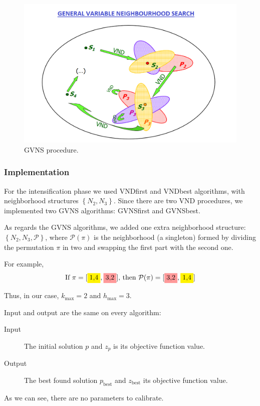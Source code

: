 \begin{figure}
	\centering
	\includegraphics[width=.65\textwidth]{GVNS.png}
	\caption{GVNS procedure.}
	\label{fig:GVNS}
\end{figure}



\subsubsection{Implementation}


For the intensification phase we used VNDfirst and VNDbest algorithms, with neighborhood structures $\left\{ N_2,  N_3\right\}$. Since there are two VND procedures, we implemented two GVNS algorithms: GVNSfirst and GVNSbest.




As regards the GVNS algorithms, we added one extra neighborhood structure: $\left\{ N_2,  N_3, \mathcal P \right\} $, where $ \mathcal P(\pi)$ is the neighborhood (a singleton) formed by dividing the permutation $\pi$ in two and swapping the first part with the second one. 

For example, 
\[
\text{If $\pi = [\colorbox{yellow}{$1$,$4$},\colorbox{red!40}{$3$,$2$}]$, then $ \mathcal P(\pi) =[\colorbox{red!40}{$3$,$2$},\colorbox{yellow}{$1$,$4$}]$}   
\]

Thus, in our case, $k_\mathrm{max}=2$ and $h_\mathrm{max}=3$.

Input and output are the same on every  algorithm:
\begin{description}
	\item[Input]  The initial solution $p$ and $z_p$ is its objective function value.
	\item[Output] The best found solution $p_\mathrm{best}$ and $z_\mathrm{best}$ its objective function value.
\end{description}

As we can see, there are no parameters to calibrate.


